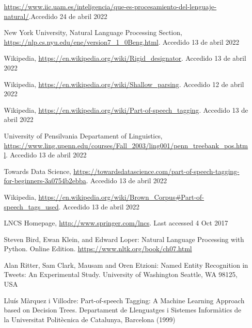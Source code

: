 \documentclass[runningheads]{llncs}
\begin{document}
\begin{thebibliography}{8}
%
%
%

\url{https://www.iic.uam.es/inteligencia/que-es-procesamiento-del-lenguaje-natural/}.Accedido 24 de abril 2022

New York University, Natural Language Processing Section, \url{https://nlp.cs.nyu.edu/ene/version7\_1\_0Beng.html}. Accedido 13 de abril 2022

Wikipedia, \url{https://en.wikipedia.org/wiki/Rigid\_designator}. Accedido 13 de abril 2022

Wikipedia, \url{https://en.wikipedia.org/wiki/Shallow\_parsing}. Accedido 12 de abril 2022

Wikipedia, \url{https://en.wikipedia.org/wiki/Part-of-speech\_tagging}. Accedido 13 de abril 2022

University of Pensilvania Departament of Linguistics, \url{https://www.ling.upenn.edu/courses/Fall\_2003/ling001/penn\_treebank\_pos.html}. Accedido 13 de abril 2022

Towards Data Science, \url{https://towardsdatascience.com/part-of-speech-tagging-for-beginners-3a0754b2ebba}. Accedido 13 de abril 2022

Wikipedia, \url{https://en.wikipedia.org/wiki/Brown\_Corpus\#Part-of-speech\_tags\_used}. Accedido 13 de abril 2022

LNCS Homepage, \url{http://www.springer.com/lncs}. Last accessed 4 Oct 2017

Steven Bird, Ewan Klein, and Edward Loper: Natural Language Processing with Python. Online Edition. \url{https://www.nltk.org/book/ch07.html}

Alan Ritter, Sam Clark, Mausam and Oren Etzioni: Named Entity Recognition in Tweets:
An Experimental Study. University of Washington Seattle, WA 98125, USA

Lluís Màrquez i Villodre: Part-of-speech Tagging: A Machine Learning Approach based on Decision Trees. Departament de Llenguatges i Sistemes Informàtics de la Universitat Politècnica de Catalunya, Barcelona (1999)


\end{thebibliography}
\end{document}
